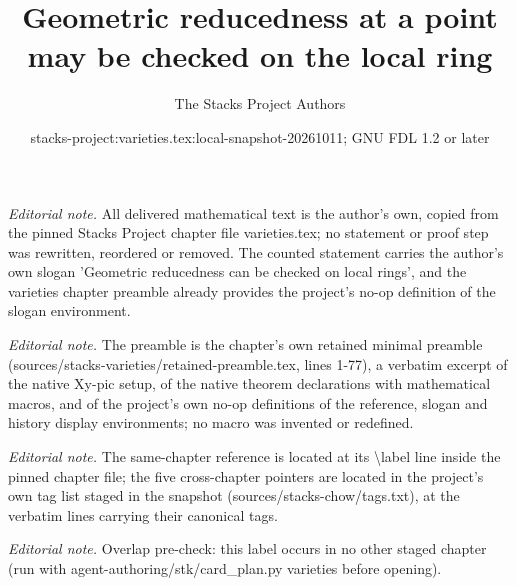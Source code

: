 \documentclass[10pt,a4paper]{amsart}
\title{Geometric reducedness at a point may be checked on the local ring}
\author{The Stacks Project Authors}
\date{stacks-project:varieties.tex:local-snapshot-20261011; GNU FDL 1.2 or later}
\theoremstyle{plain}
\theoremstyle{definition}
\theoremstyle{remark}
\numberwithin{equation}{subsection}
\begin{document}
\maketitle
\noindent\textit{Editorial note.} All delivered mathematical text is the author's own, copied from the pinned Stacks Project chapter file varieties.tex; no statement or proof step was rewritten, reordered or removed. The counted statement carries the author's own slogan 'Geometric reducedness can be checked on local rings', and the varieties chapter preamble already provides the project's no-op definition of the slogan environment.\par\medskip
\noindent\textit{Editorial note.} The preamble is the chapter's own retained minimal preamble (sources/stacks-varieties/retained-preamble.tex, lines 1-77), a verbatim excerpt of the native Xy-pic setup, of the native theorem declarations with mathematical macros, and of the project's own no-op definitions of the reference, slogan and history display environments; no macro was invented or redefined.\par\medskip
\noindent\textit{Editorial note.} The same-chapter reference is located at its \textbackslash{}label line inside the pinned chapter file; the five cross-chapter pointers are located in the project's own tag list staged in the snapshot (sources/stacks-chow/tags.txt), at the verbatim lines carrying their canonical tags.\par\medskip
\noindent\textit{Editorial note.} Overlap pre-check: this label occurs in no other staged chapter (run with agent-authoring/stk/card\_plan.py varieties before opening).\par\medskip
\end{document}
